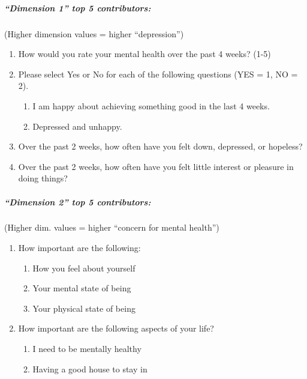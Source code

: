 \hypertarget{dimension-1-top-5-contributors}{%
\subparagraph{``Dimension 1'' top 5
contributors:}\label{dimension-1-top-5-contributors}}

(Higher dimension values = higher ``depression'')

\begin{enumerate}
\def\labelenumi{\arabic{enumi}.}
\tightlist
\item
  How would you rate your mental health over the past 4 weeks? (1-5)
\item
  Please select Yes or No for each of the following questions (YES = 1,
  NO = 2).

  \begin{enumerate}
  \def\labelenumii{\alph{enumii}.}
  \tightlist
  \item
    I am happy about achieving something good in the last 4 weeks.
  \item
    Depressed and unhappy.
  \end{enumerate}
\item
  Over the past 2 weeks, how often have you felt down, depressed, or
  hopeless?
\item
  Over the past 2 weeks, how often have you felt little interest or
  pleasure in doing things?
\end{enumerate}

\hypertarget{dimension-2-top-5-contributors}{%
\subparagraph{``Dimension 2'' top 5
contributors:}\label{dimension-2-top-5-contributors}}

(Higher dim. values = higher ``concern for mental health'')

\begin{enumerate}
\def\labelenumi{\arabic{enumi}.}
\tightlist
\item
  How important are the following:

  \begin{enumerate}
  \def\labelenumii{\alph{enumii}.}
  \tightlist
  \item
    How you feel about yourself
  \item
    Your mental state of being
  \item
    Your physical state of being
  \end{enumerate}
\item
  How important are the following aspects of your life?

  \begin{enumerate}
  \def\labelenumii{\alph{enumii}.}
  \tightlist
  \item
    I need to be mentally healthy
  \item
    Having a good house to stay in
  \end{enumerate}
\end{enumerate}

